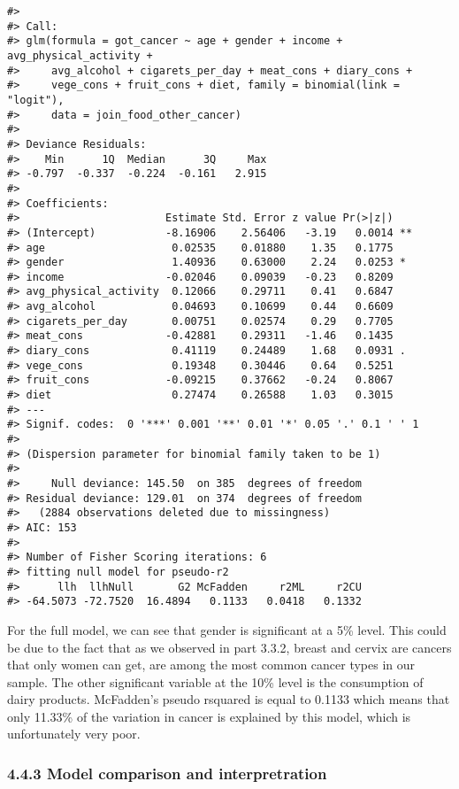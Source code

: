 \documentclass[
]{article}
\begin{document}
\begin{verbatim}
#> 
#> Call:
#> glm(formula = got_cancer ~ age + gender + income + avg_physical_activity + 
#>     avg_alcohol + cigarets_per_day + meat_cons + diary_cons + 
#>     vege_cons + fruit_cons + diet, family = binomial(link = "logit"), 
#>     data = join_food_other_cancer)
#> 
#> Deviance Residuals: 
#>    Min      1Q  Median      3Q     Max  
#> -0.797  -0.337  -0.224  -0.161   2.915  
#> 
#> Coefficients:
#>                       Estimate Std. Error z value Pr(>|z|)   
#> (Intercept)           -8.16906    2.56406   -3.19   0.0014 **
#> age                    0.02535    0.01880    1.35   0.1775   
#> gender                 1.40936    0.63000    2.24   0.0253 * 
#> income                -0.02046    0.09039   -0.23   0.8209   
#> avg_physical_activity  0.12066    0.29711    0.41   0.6847   
#> avg_alcohol            0.04693    0.10699    0.44   0.6609   
#> cigarets_per_day       0.00751    0.02574    0.29   0.7705   
#> meat_cons             -0.42881    0.29311   -1.46   0.1435   
#> diary_cons             0.41119    0.24489    1.68   0.0931 . 
#> vege_cons              0.19348    0.30446    0.64   0.5251   
#> fruit_cons            -0.09215    0.37662   -0.24   0.8067   
#> diet                   0.27474    0.26588    1.03   0.3015   
#> ---
#> Signif. codes:  0 '***' 0.001 '**' 0.01 '*' 0.05 '.' 0.1 ' ' 1
#> 
#> (Dispersion parameter for binomial family taken to be 1)
#> 
#>     Null deviance: 145.50  on 385  degrees of freedom
#> Residual deviance: 129.01  on 374  degrees of freedom
#>   (2884 observations deleted due to missingness)
#> AIC: 153
#> 
#> Number of Fisher Scoring iterations: 6
#> fitting null model for pseudo-r2
#>      llh  llhNull       G2 McFadden     r2ML     r2CU 
#> -64.5073 -72.7520  16.4894   0.1133   0.0418   0.1332
\end{verbatim}

For the full model, we can see that gender is significant at a 5\%
level. This could be due to the fact that as we observed in part 3.3.2,
breast and cervix are cancers that only women can get, are among the
most common cancer types in our sample. The other significant variable
at the 10\% level is the consumption of dairy products. McFadden's
pseudo rsquared is equal to 0.1133 which means that only 11.33\% of the
variation in cancer is explained by this model, which is unfortunately
very poor.

\hypertarget{model-comparison-and-interpretration}{%
\subsubsection{4.4.3 Model comparison and
interpretration}\label{model-comparison-and-interpretration}}
\end{document}
